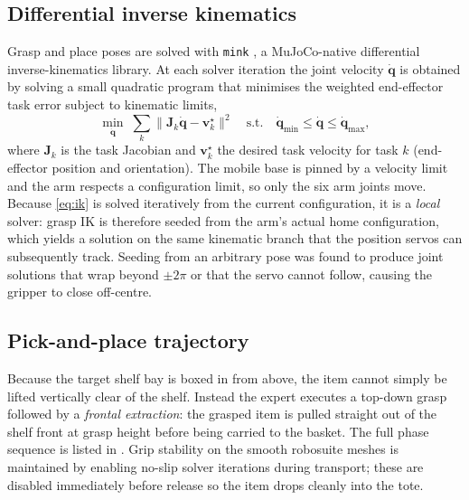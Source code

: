 \subsection{Differential inverse kinematics}
\label{sec:m-ik}
Grasp and place poses are solved with \texttt{mink} \parencite{zakka2024mink}, a
MuJoCo-native differential inverse-kinematics library. At each solver iteration the joint velocity
$\dot{\mathbf{q}}$ is obtained by solving a small quadratic program that minimises
the weighted end-effector task error subject to kinematic limits,
\begin{equation}
\min_{\dot{\mathbf{q}}}\;
\sum_{k} \big\lVert \mathbf{J}_k \dot{\mathbf{q}} - \mathbf{v}_k^{\star} \big\rVert^2
\quad\text{s.t.}\quad
\dot{\mathbf{q}}_{\min} \le \dot{\mathbf{q}} \le \dot{\mathbf{q}}_{\max},
\label{eq:ik}
\end{equation}
where $\mathbf{J}_k$ is the task Jacobian and $\mathbf{v}_k^\star$ the desired task
velocity for task $k$ (end-effector position and orientation). The mobile base is
pinned by a velocity limit and the arm respects a configuration limit, so only the
six arm joints move. Because \eqref{eq:ik} is solved iteratively from the current
configuration, it is a \emph{local} solver: grasp IK is therefore seeded from the
arm's actual home configuration, which yields a solution on the same kinematic
branch that the position servos can subsequently track. Seeding from an arbitrary
pose was found to produce joint solutions that wrap beyond $\pm 2\pi$ or that the
servo cannot follow, causing the gripper to close off-centre.

\subsection{Pick-and-place trajectory}
\label{sec:m-traj}
Because the target shelf bay is boxed in from above, the item cannot simply be
lifted vertically clear of the shelf. Instead the expert executes a top-down grasp
followed by a \emph{frontal extraction}: the grasped item is pulled straight out of
the shelf front at grasp height before being carried to the basket. The full phase
sequence is listed in . Grip stability on the smooth robosuite
meshes is maintained by enabling no-slip solver iterations during transport; these
are disabled immediately before release so the item drops cleanly into the tote.

